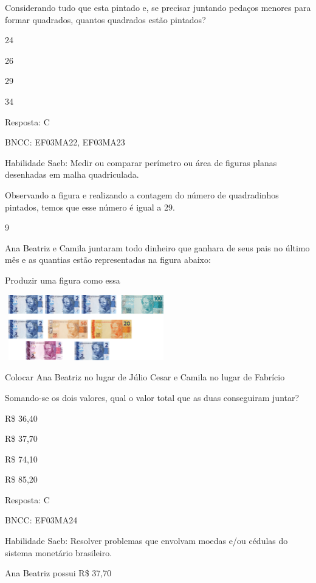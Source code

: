 \begin{escolha}
\begin{escolha}
Considerando tudo que esta pintado e, se precisar juntando pedaços
menores para formar quadrados, quantos quadrados estão pintados?

\begin{escolha}
\item
  24
\item
  26
\item
  29
\item
  34
\end{escolha}

Resposta: C

BNCC: EF03MA22, EF03MA23

Habilidade Saeb: Medir ou comparar perímetro ou área de figuras planas
desenhadas em malha quadriculada.

Observando a figura e realizando a contagem do número de quadradinhos
pintados, temos que esse número é igual a 29.

\num{9}

Ana Beatriz e Camila juntaram todo dinheiro que ganhara de seus pais no
último mês e as quantias estão representadas na figura abaixo:

Produzir uma figura como essa

\includegraphics[width=2.77564in,height=1.11703in]{media/image110.png}

Colocar Ana Beatriz no lugar de Júlio Cesar e Camila no lugar de
Fabrício

Somando-se os dois valores, qual o valor total que as duas conseguiram
juntar?

\begin{escolha}
\item
  R\$ 36,40
\item
  R\$ 37,70
\item
  R\$ 74,10
\item
  R\$ 85,20
\end{escolha}

Resposta: C

BNCC: EF03MA24

Habilidade Saeb: Resolver problemas que envolvam moedas e/ou cédulas do
sistema monetário brasileiro.

Ana Beatriz possui R\$ 37,70


\end{escolha}
\end{escolha}
